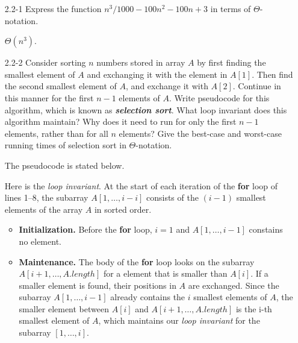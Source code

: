 \documentclass{report}
\makeatletter
\renewenvironment{framed}{%
 \def\FrameCommand##1{\hskip\@totalleftmargin
 \fboxsep=\FrameSep\fbox{##1}}%
 \MakeFramed {\advance\hsize-\width
   \@totalleftmargin\z@ \linewidth\hsize
   \@setminipage}}%
 {\par\unskip\endMakeFramed}
\makeatother
\begin{document}
\begin{enumerate}

\item[2.2{-}1]{Express the function $n^3/1000 - 100n^2 - 100n + 3$ in terms of
$\Theta$-notation.}

\begin{framed}
  $\Theta(n^3)$.
\end{framed}

\item[2.2{-}2]{Consider sorting $n$ numbers stored in array $A$ by first finding
the smallest element of $A$ and exchanging it with the element in $A[1]$. Then
find the second smallest element of $A$, and exchange it with $A[2]$.  Continue
in this manner for the first $n - 1$ elements of $A$. Write pseudocode for this
algorithm, which is known as \textbf{\emph{selection sort}}. What loop invariant
does this algorithm maintain? Why does it need to run for only the first $n - 1$
elements, rather than for all $n$ elements? Give the best-case and worst-case
running times of selection sort in $\Theta$-notation.}

\begin{framed}
The pseudocode is stated below.\\
\begin{algorithm}[H]
\SetAlgoNoEnd\DontPrintSemicolon
\BlankLine
{}
\end{algorithm}

Here is the \emph{loop invariant}. At the start of each iteration of the
\textbf{for} loop of lines 1{--}8, the subarray $A[1, \dots, i - i]$ consists of
the $(i - 1)$ smallest elements of the array $A$ in sorted order.

\begin{itemize}
  \item \textbf{Initialization.} Before the \textbf{for} loop, $i = 1$ and $A[1,
    \dots, i - 1]$ constains no element.

  \item \textbf{Maintenance.} The body of the \textbf{for} loop looks on the
    subarray $A[i + 1, \dots, A.length]$ for a element that is smaller than
    $A[i]$. If a smaller element is found, their positions in $A$ are exchanged.
    Since the subarray $A[1, \dots, i - 1]$ already contains the $i$ smallest
    elements of $A$, the smaller element between $A[i]$ and $A[i + 1, \dots,
    A.length]$ is the i-th smallest element of $A$, which maintains our
    \emph{loop invariant} for the subarray $[1, \dots, i]$.


\end{itemize}
\end{framed}
\end{enumerate}
\end{document}
